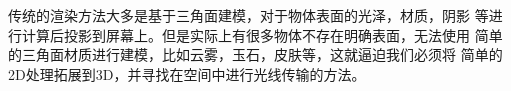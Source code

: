 传统的渲染方法大多是基于三角面建模，对于物体表面的光泽，材质，阴影
等进行计算后投影到屏幕上。但是实际上有很多物体不存在明确表面，无法使用
简单的三角面材质进行建模，比如云雾，玉石，皮肤等，这就逼迫我们必须将
简单的2D处理拓展到3D，并寻找在空间中进行光线传输的方法。